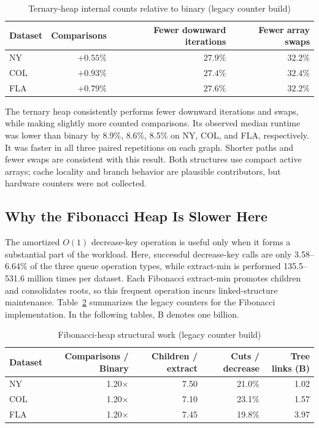 \documentclass[12pt,a4paper]{report}
\begin{document}
\begin{table}[H]
  \centering
  \caption{Ternary-heap internal counts relative to binary (legacy counter build)}
  \label{tab:array-counters}
  \small
  \begin{tabular}{lrrr}
    \toprule
    Dataset & Comparisons & Fewer downward iterations & Fewer array swaps \\
    \midrule
    NY  & $+0.55\%$ & $27.9\%$ & $32.2\%$ \\
    COL & $+0.93\%$ & $27.4\%$ & $32.4\%$ \\
    FLA & $+0.79\%$ & $27.6\%$ & $32.2\%$ \\
    \bottomrule
  \end{tabular}
\end{table}

The ternary heap consistently performs fewer downward iterations and swaps,
while making slightly more counted comparisons. Its observed median runtime
was lower than binary by 8.9\%, 8.6\%, 8.5\% on NY, COL,
and FLA, respectively. It was faster in all three paired repetitions
on each graph. Shorter paths and fewer swaps are consistent with this
result. Both structures use compact active arrays; cache locality and
branch behavior are plausible contributors, but hardware counters were
not collected.

\subsection{Why the Fibonacci Heap Is Slower Here}
The amortized $O(1)$ decrease-key operation is useful only when it forms a
substantial part of the workload. Here, successful decrease-key calls are
only 3.58--6.64\% of the three queue operation types, while extract-min is
performed 135.5--531.6 million times per dataset. Each Fibonacci extract-min
promotes children and consolidates roots, so this frequent operation incurs
linked-structure maintenance. Table~\ref{tab:fib-counters} summarizes the
legacy counters for the Fibonacci implementation.
In the following tables, B denotes one billion.

\begin{table}[H]
  \centering
  \caption{Fibonacci-heap structural work (legacy counter build)}
  \label{tab:fib-counters}
  \small
  \begin{tabular}{lrrrr}
    \toprule
    Dataset & Comparisons / Binary & Children / extract & Cuts / decrease & Tree links (B) \\
    \midrule
    NY  & 1.20$\times$ & 7.50 & 21.0\% & 1.02 \\
    COL & 1.20$\times$ & 7.10 & 23.1\% & 1.57 \\
    FLA & 1.20$\times$ & 7.45 & 19.8\% & 3.97 \\
    \bottomrule
  \end{tabular}
\end{table}
\end{document}
